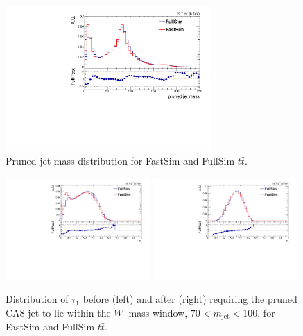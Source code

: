 \begin{figure}[htpb]
\centering
\includegraphics[width=0.7\textwidth]{figures/razor_wtag/FastFull_comparison_TTJets_jmass}
\caption{Pruned jet mass distribution for FastSim and FullSim $t\bar{t}$. 
\label{fig:FastFull_jmass}}
\end{figure}

\begin{figure}[p]
\includegraphics[width=0.49\textwidth]{figures/razor_wtag/FastFull_comparison_TTJets_tau1}
\includegraphics[width=0.49\textwidth]{figures/razor_wtag/FastFull_comparison_TTJets_tau1_masscut}
\caption{Distribution of $\tau_1$ before (left) and after (right) requiring the pruned CA8 jet to
lie within the $W$ mass window, $70 < m_{\textrm{jet}} < 100$\GeV, for FastSim and
FullSim $t\bar{t}$.
\label{fig:FastFull_tau1}}
\end{figure}

